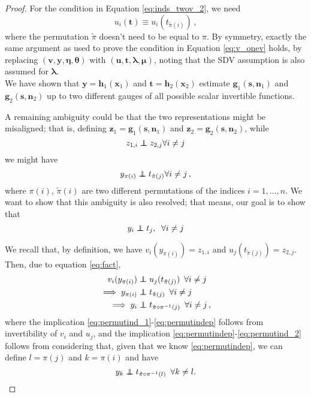 \begin{proof}
For the condition in Equation \ref{eq:inds_twov_2}, we need
\begin{equation}
\label{eq:u_onev}
u_{i}(\bm{t})  \equiv u_{i}(t_{\tilde{\pi}(i)})\,,
\end{equation}
where the permutation $\tilde{\pi}$ doesn't need to be equal to $\pi$.
By symmetry, exactly the same argument as used to prove the condition in Equation \ref{eq:v_onev} holds, by replacing $(\bm{v},\bm{y}, \bm{\eta}, \bm{\theta})$ with $(\bm{u},\bm{t}, \bm{\lambda}, \bm{\mu})$, noting that the SDV assumption is also assumed for $\bm{\lambda}$.
\\
We have shown that $\bm{y}=\bm{h}_1(\bm{x}_1)$ and $\bm{t}=\bm{h}_2(\bm{x}_2)$ estimate $\bm{g}_1(\bm{s}, \bm{n}_1)$ and $\bm{g}_2(\bm{s}, \bm{n}_2)$ up to two different gauges of all possible scalar invertible functions.

A remaining ambiguity could be that the two representations might be misaligned; that is, defining $\bm{z}_1=\bm{g}_1(\bm{s}, \bm{n}_1)$ and $\bm{z}_2=\bm{g}_2(\bm{s}, \bm{n}_2)$, while
\begin{equation}
z_{1,i} \independent z_{2,j} \forall i \neq j \label{eq:fact}
\end{equation}
we might have
\[
y_{\pi(i)} \independent t_{\tilde{\pi}(j)} \forall i \neq j\,,
\]
where $\pi(i)$, $\tilde{\pi}(i)$ are two different permutations of the indices $i=1, \ldots, n$. We want to show that this ambiguity is also resolved; that means, our goal is to show that
\begin{equation}
y_{i} \independent t_{j},\;\;\forall i \neq j \label{eq:aim_lastpart}
\end{equation}


We recall that, by definition, we have $v_i(y_{\pi(i)}) = z_{1,i}$ and $u_j(t_{\tilde{\pi}(j)}) = z_{2,j}$. Then, due to equation \ref{eq:fact},
\begin{align}
v_i(y_{\pi(i)}) & \independent u_j(t_{\tilde{\pi}(j)}) \,\,\, \forall i \neq j \label{eq:permutind_1}\\
\implies y_{\pi(i)} & \independent t_{\tilde{\pi}(j)} \,\,\, \forall i \neq j \label{eq:permutindep}\\
\implies y_{i} & \independent t_{\tilde{\pi}\circ \pi^{-1} (j)} \,\,\, \forall i \neq j\,, \label{eq:permutind_2}
\end{align}
where the implication \ref{eq:permutind_1}-\ref{eq:permutindep} follows from invertibility of $v_i$ and $u_j$, and the implication \ref{eq:permutindep}-\ref{eq:permutind_2} follows from considering that, given that we know \ref{eq:permutindep}, we can define $l=\pi(j)$ and $k=\pi(i)$ and have
\[
y_{k}  \independent t_{\tilde{\pi} \circ \pi^{-1} (l)} \,\,\, \forall k \neq l.
\]


\end{proof}
